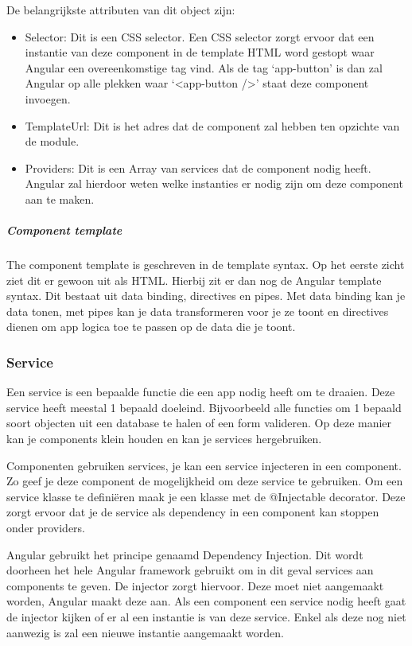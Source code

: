 De belangrijkste attributen van dit object zijn:
\begin{itemize}
	\item Selector: Dit is een CSS selector. Een CSS selector zorgt ervoor dat een instantie van deze component in de template HTML word gestopt waar Angular een overeenkomstige tag vind. Als de tag ‘app-button’ is dan zal Angular op alle plekken waar ‘<app-button />’ staat deze component invoegen.
	\item TemplateUrl: Dit is het adres dat de component zal hebben ten opzichte van de module.
	\item Providers: Dit is een Array van services dat de component nodig heeft. Angular zal hierdoor weten welke instanties er nodig zijn om deze component aan te maken.
\end{itemize}

\subparagraph{Component template}
The component template is geschreven in de template syntax. Op het eerste zicht ziet dit er gewoon uit als HTML. Hierbij zit er dan nog de Angular template syntax. Dit bestaat uit data binding, directives en pipes. Met data binding kan je data tonen, met pipes kan je data transformeren voor je ze toont en directives dienen om app logica toe te passen op de data die je toont.

\subsubsection{Service}
\label{sec:Angular_Service}
Een service is een bepaalde functie die een app nodig heeft om te draaien. Deze service heeft meestal 1 bepaald doeleind. Bijvoorbeeld alle functies om 1 bepaald soort objecten uit een database te halen of een form valideren. Op deze manier kan je components klein houden en kan je services hergebruiken.

Componenten gebruiken services, je kan een service injecteren in een component. Zo geef je deze component de mogelijkheid om deze service te gebruiken. Om een service klasse te definiëren maak je een klasse met de @Injectable decorator. Deze zorgt ervoor dat je de service als dependency in een component kan stoppen onder providers.

Angular gebruikt het principe genaamd Dependency Injection. Dit wordt doorheen het hele Angular framework gebruikt om in dit geval services aan components te geven. De injector zorgt hiervoor. Deze moet niet aangemaakt worden, Angular maakt deze aan. Als een component een service nodig heeft gaat de injector kijken of er al een instantie is van deze service. Enkel als deze nog niet aanwezig is zal een nieuwe instantie aangemaakt worden.

